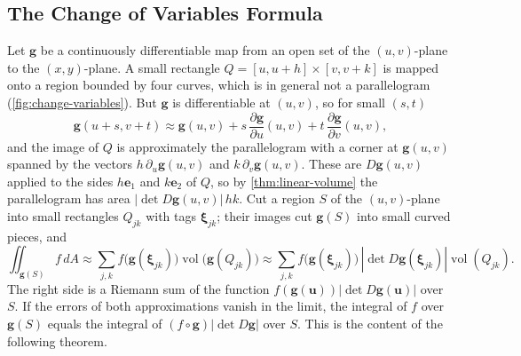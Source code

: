 \subsection{The Change of Variables Formula}

Let $\mathbf g$ be a continuously differentiable map from an open set of the $(u,v)$-plane to the $(x,y)$-plane. A small rectangle $Q=[u,u+h]\times[v,v+k]$ is mapped onto a region bounded by four curves, which is in general not a parallelogram (\cref{fig:change-variables}). But $\mathbf g$ is differentiable at $(u,v)$, so for small $(s,t)$
\[
\mathbf g(u+s,v+t)\approx\mathbf g(u,v)+s\,\frac{\partial\mathbf g}{\partial u}(u,v)+t\,\frac{\partial\mathbf g}{\partial v}(u,v),
\]
and the image of $Q$ is approximately the parallelogram with a corner at $\mathbf g(u,v)$ spanned by the vectors $h\,\partial_u\mathbf g(u,v)$ and $k\,\partial_v\mathbf g(u,v)$. These are $D\mathbf g(u,v)$ applied to the sides $h\mathbf e_1$ and $k\mathbf e_2$ of $Q$, so by \cref{thm:linear-volume} the parallelogram has area $|\det D\mathbf g(u,v)|\,hk$. Cut a region $S$ of the $(u,v)$-plane into small rectangles $Q_{jk}$ with tags $\boldsymbol\xi_{jk}$; their images cut $\mathbf g(S)$ into small curved pieces, and
\[
\iint_{\mathbf g(S)}f\,dA\approx\sum_{j,k}f\bigl(\mathbf g(\boldsymbol\xi_{jk})\bigr)\operatorname{vol}\bigl(\mathbf g(Q_{jk})\bigr)\approx\sum_{j,k}f\bigl(\mathbf g(\boldsymbol\xi_{jk})\bigr)\,|\det D\mathbf g(\boldsymbol\xi_{jk})|\operatorname{vol}(Q_{jk}).
\]
The right side is a Riemann sum of the function $f(\mathbf g(\mathbf u))|\det D\mathbf g(\mathbf u)|$ over $S$. If the errors of both approximations vanish in the limit, the integral of $f$ over $\mathbf g(S)$ equals the integral of $(f\circ\mathbf g)|\det D\mathbf g|$ over $S$. This is the content of the following theorem.

